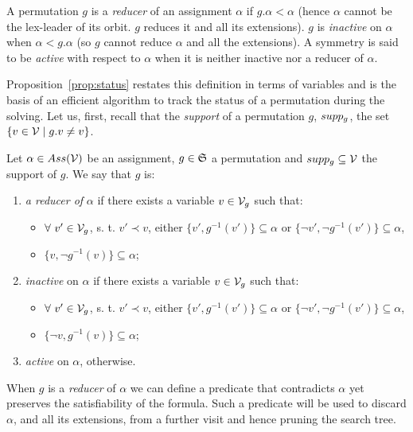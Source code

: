 \begin{definition}
  A permutation $g$ is a \emph{reducer} of an assignment $\alpha$ if $g.\alpha < \alpha$ 
  (hence $\alpha$ cannot be the lex-leader of its orbit. $g$ reduces it and all its extensions). $g$ is
 \emph{inactive} on $\alpha$ when $\alpha < g.\alpha$ (so $g$ cannot reduce $\alpha$ and all
 the extensions). A symmetry is said to be \emph{active} with respect to $\alpha$
 when it is neither inactive nor a reducer of $\alpha$. 
\end{definition}
Proposition~\ref{prop:status} restates this definition in terms of variables
and is the basis of an efficient algorithm to track the status of a
permutation during the solving. Let us, first, recall that the \emph{support}
 of a permutation $g$, $supp_g$, the set $\{ v \in \mathcal{V} \mid g.v \neq v\}$.
\begin{proposition}
 \label{prop:status}
 Let $\alpha \in Ass(\mathcal{V})$ be an assignment, $g \in \mathfrak{S}$ a permutation and $ supp_g \subseteq  \mathcal{V}$ the support of $g$. We say that $g$ is:
 \begin{enumerate}
  \item  \emph{a reducer of} $\alpha$  if there exists a variable $v \in \mathcal{V}_g$
  such that:
  \begin{itemize}
   \item $\forall\ v' \in \mathcal{V}_g$, s. t. $v' \prec v$, either $\{v', g^{-1}(v')\}\subseteq\alpha $ or $\{\neg v', \neg g^{-1}(v')\} \subseteq \alpha $,
   \item $\{v, \neg g^{-1}(v)\} \subseteq \alpha$;
  \end{itemize}
  \item  \emph{inactive} on $\alpha$  if there exists a variable $v \in \mathcal{V}_g$
  such that:
  \begin{itemize}
   \item $\forall\ v' \in \mathcal{V}_g$, s. t. $v' \prec v$, either $\{v', g^{-1}(v')\}\subseteq\alpha $ or $\{\neg v', \neg g^{-1}(v')\} \subseteq \alpha $,
   \item $\{\neg v, g^{-1}(v)\} \subseteq \alpha$;
  \end{itemize}
  \item  \emph{active} on $\alpha$, otherwise.
 \end{enumerate}
\end{proposition}
When $g$ is a \textit{reducer} of $\alpha$ we can define a predicate that contradicts $\alpha$ yet preserves the satisfiability of the formula. Such a predicate will be used to discard $\alpha$, and all its extensions, from a further visit and hence pruning the search tree.

